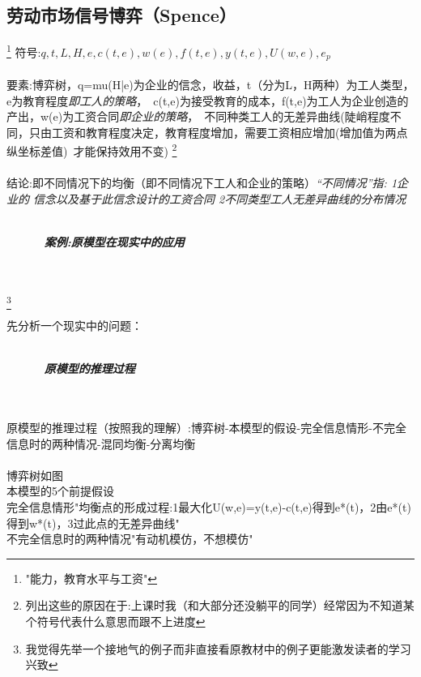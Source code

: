 \documentclass{article}
\begin{document}
\subsection{劳动市场信号博弈（Spence）}\footnote{"能力，教育水平与工资"}
符号:$q,t,L,H,e,c(t,e),w(e),f(t,e),y(t,e),U(w,e),e_p$\\\\

要素:博弈树，q=mu(H|e)为企业的信念，收益，t（分为L，H两种）为工人类型，e为教育程度\emph{即工人的策略}，\
c(t,e)为接受教育的成本，f(t,e)为工人为企业创造的产出，w(e)为工资合同\emph{即企业的策略}，\
不同种类工人的无差异曲线(陡峭程度不同，只由工资和教育程度决定，教育程度增加，需要工资相应增加(增加值为两点纵坐标差值)\
才能保持效用不变) \footnote{列出这些的原因在于:上课时我（和大部分还没躺平的同学）经常因为不知道某个符号代表什么意思而跟不上进度}\\\\

结论:即不同情况下的均衡（即不同情况下工人和企业的策略）\emph{“不同情况”指: 1企业的
信念以及基于此信念设计的工资合同 2不同类型工人无差异曲线的分布情况}\\\\
\begin{center}
    \zihao{4}
    \textbf{\emph{案例:原模型在现实中的应用}\\\\}
    \end{center}
\footnote{我觉得先举一个接地气的例子而非直接看原教材中的例子更能激发读者的学习兴致}

先分析一个现实中的问题：\\\\
\begin{center}
    \textbf{\emph{原模型的推理过程}}\\\\
    \end{center}
原模型的推理过程（按照我的理解）:博弈树-本模型的假设-完全信息情形-不完全信息时的两种情况-混同均衡-分离均衡\\\\

博弈树如图\\

本模型的5个前提假设\\完全信息情形"均衡点的形成过程:1最大化U(w,e)=y(t,e)-c(t,e)得到e*(t)，2由e*(t)得到w*(t)，3过此点的无差异曲线"\\

不完全信息时的两种情况"有动机模仿，不想模仿"\\
\end{document}
